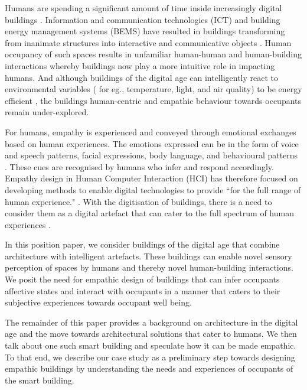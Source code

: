 \documentclass [sigconf, review, anonymous] {acmart}
\begin{document}
Humans are spending a significant amount of time inside increasingly digital buildings \cite{alavi2016future}. Information and communication technologies (ICT) and building energy management systems (BEMS) have resulted in buildings transforming from inanimate structures into interactive and communicative objects \cite{nembrini2017human}. Human occupancy of such spaces results in unfamiliar human-human and human-building interactions whereby buildings now play a more intuitive role in impacting humans. And although buildings of the digital age can intelligently react to environmental variables ( for eg., temperature, light, and air quality) to be energy efficient \cite{bluyssen2009indoor, moreno2014user}, the buildings human-centric and empathic behaviour towards occupants remain under-explored. 

For humans, empathy is experienced and conveyed through emotional exchanges based on human experiences. The emotions expressed can be in the form of voice and speech patterns, facial expressions, body language, and behavioural patterns \cite{riess2017science}. These cues are recognised by humans who infer and respond accordingly. Empathy design in Human Computer Interaction (HCI) has therefore focused on developing methods to enable digital technologies to provide ``for the full range of human experience." \cite{wright2008empathy}. With the digitisation of buildings, there is a need to consider them as a digital artefact that can cater to the full spectrum of human experiences \cite{derix2014empathic}. 

In this position paper, we consider buildings of the digital age that combine architecture with intelligent artefacts. These buildings can enable novel sensory perception of spaces by humans and thereby novel human-building interactions. We posit the need for empathic design of buildings that can infer occupants affective states and interact with occupants in a manner that caters to their subjective experiences towards occupant well being. 

The remainder of this paper provides a background on architecture in the digital age and the move towards architectural solutions that cater to humans. We then talk about one such smart building and speculate how it can be made empathic. To that end, we describe our case study as a preliminary step towards designing empathic buildings by understanding the needs and experiences of occupants of the smart building. 
\end{document}
